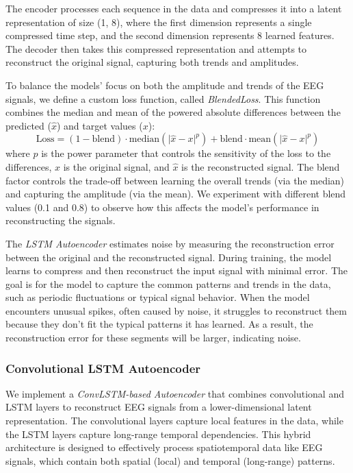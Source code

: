 The encoder processes each sequence in the data and compresses it into a latent representation of size (1, 8), where the first dimension represents a single compressed time step, and the second dimension represents 8 learned features. The decoder then takes this compressed representation and attempts to reconstruct the original signal, capturing both trends and amplitudes.

To balance the models' focus on both the amplitude and trends of the EEG signals, we define a custom loss function, called \emph{BlendedLoss}. This function combines the median and mean of the powered absolute differences between the predicted ($\hat{x}$) and target values ($x$):
%
\begin{equation}
\text{Loss} = (1 - \text{blend}) \cdot \text{median}(\lvert \hat{x} - x \rvert^p) + \text{blend} \cdot \text{mean}(\lvert \hat{x} - x \rvert^p)
\label{eq:blended_loss}
\end{equation}
%
where $p$ is the power parameter that controls the sensitivity of the loss to the differences, $x$ is the original signal, and $\hat{x}$ is the reconstructed signal. The blend factor controls the trade-off between learning the overall trends (via the median) and capturing the amplitude (via the mean). We experiment with different blend values (0.1 and 0.8) to observe how this affects the model’s performance in reconstructing the signals.

The \emph{LSTM Autoencoder} estimates noise by measuring the reconstruction error between the original and the reconstructed signal. During training, the model learns to compress and then reconstruct the input signal with minimal error. The goal is for the model to capture the common patterns and trends in the data, such as periodic fluctuations or typical signal behavior. When the model encounters unusual spikes, often caused by noise, it struggles to reconstruct them because they don't fit the typical patterns it has learned. As a result, the reconstruction error for these segments will be larger, indicating noise.

\subsubsection{Convolutional LSTM Autoencoder}

We implement a \emph{ConvLSTM-based Autoencoder} that combines convolutional and LSTM layers to reconstruct EEG signals from a lower-dimensional latent representation. The convolutional layers capture local features in the data, while the LSTM layers capture long-range temporal dependencies. This hybrid architecture is designed to effectively process spatiotemporal data like EEG signals, which contain both spatial (local) and temporal (long-range) patterns.

